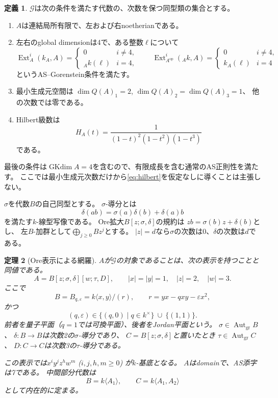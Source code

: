 \documentclass[11pt,a4paper]{ltjsarticle}
\newtheorem{theorem}{定理}[section]
\theoremstyle{definition}
\newtheorem{definition}[theorem]{定義}
\newcommand{\Aut}{\operatorname{Aut}}
\newcommand{\Ext}{\operatorname{Ext}}
\newcommand{\GKdim}{\operatorname{GKdim}}
\newcommand{\Gclass}{\mathcal G}
\begin{document}
\begin{definition}\label{def:graded-target}
$\Gclass$は次の条件を満たす代数の、次数を保つ同型類の集合とする。
\begin{enumerate}
\item $A$は連結局所有限で、左および右noetherianである。
\item 左右のglobal dimensionは4で、ある整数$\ell$について
\[
\Ext_A^i(k_A,A)=
\begin{cases}0&i\ne4,\\ {}_Ak(\ell)&i=4,\end{cases}
\qquad
\Ext_{A^{\mathrm{op}}}^i({}_Ak,A)=
\begin{cases}0&i\ne4,\\ k_A(\ell)&i=4\end{cases}
\]
というAS--Gorenstein条件を満たす。
\item 最小生成元空間は
$\dim Q(A)_1=2$, $\dim Q(A)_2=\dim Q(A)_3=1$、
他の次数では零である。
\item Hilbert級数は
\begin{equation}\label{eq:hilbert}
H_A(t)=\frac{1}{(1-t)^2(1-t^2)(1-t^3)}
\end{equation}
である。
\end{enumerate}
最後の条件は$\GKdim A=4$を含むので、有限成長を含む通常のAS正則性を満たす。
ここでは最小生成元次数だけから\eqref{eq:hilbert}を仮定なしに導くことは主張しない。
\end{definition}

$\sigma$を代数$B$の自己同型とする。
$\sigma$-導分とは
\[
\delta(ab)=\sigma(a)\delta(b)+\delta(a)b
\]
を満たす$k$-線型写像である。
Ore拡大$B[z;\sigma,\delta]$の規約は
$zb=\sigma(b)z+\delta(b)$とし、
左$B$-加群として$\bigoplus_{j\geq0}Bz^j$とする。
$|z|=d$なら$\sigma$の次数は0、$\delta$の次数は$d$である。

\begin{theorem}[Ore表示による網羅]\label{thm:ore-exhaustion}
$A$が$\Gclass$の対象であることは、次の表示を持つことと同値である。
\begin{equation}\label{eq:iterated-ore}
A=B[z;\sigma,\delta][w;\tau,D],\qquad |x|=|y|=1,\quad |z|=2,\quad |w|=3.
\end{equation}
ここで
\begin{equation}\label{eq:plane}
B=B_{q,\varepsilon}
=k\langle x,y\rangle/(r),\qquad r=yx-qxy-\varepsilon x^2,
\end{equation}
かつ
\[
(q,\varepsilon)\in
\{(q,0)\mid q\in k^\times\}\ \cup\ \{(1,1)\}.
\]
前者を量子平面（$q=1$では可換平面）、後者をJordan平面という。
$\sigma\in\Aut_{\mathrm{gr}}B$、
$\delta:B\to B$は次数2の$\sigma$-導分であり、
$C=B[z;\sigma,\delta]$と置いたとき
$\tau\in\Aut_{\mathrm{gr}}C$、
$D:C\to C$は次数3の$\tau$-導分である。

この表示では$x^iy^jz^hw^m$ ($i,j,h,m\geq0$) が$k$-基底となる。
$A$はdomainで、AS添字は7である。
中間部分代数は
\begin{equation}\label{eq:canonical-flag}
B=k\langle A_1\rangle,\qquad C=k\langle A_1,A_2\rangle
\end{equation}
として内在的に定まる。
\end{theorem}
\end{document}
